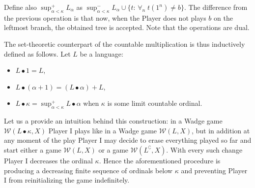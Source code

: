 Define also
$\sup^+ _{\alpha < \kappa} L_\alpha$ as $\sup^-_{\alpha < \kappa} L_\alpha\cup \{t :\, \forall_n\; t(1^n)\neq b\}$.
The difference from the previous operation is that now, when the
Player does not plays $b$ on the leftmost branch, the obtained tree is
accepted. Note that the operations are dual. 
%





The set-theoretic counterpart of the countable multiplication is thus  inductively defined as follows. 
Let $L$ be a language: 
\begin{itemize}
\item $L \bullet 1 = L$, 
\item $L \bullet (\alpha + 1) = (L \bullet \alpha)+L$, 
\item $L \bullet \kappa = \sup^+_{\alpha < \kappa} L \bullet \alpha$ when $\kappa$  is some limit countable ordinal.
\end{itemize}

Let us a provide an intuition behind this construction:  in a Wadge game $\mathcal{W}(L\bullet \kappa, X)$ Player I plays like in a Wadge game $\mathcal{W}(L, X)$, but in addition at any moment of the play Player I may decide to erase everything played so far and start either a game $\mathcal{W}(L, X)$ or a game $\mathcal{W}(L^\complement, X)$. 
With every such change Player I decreases the ordinal $\kappa$. Hence the aforementioned procedure is producing a decreasing finite sequence of ordinals below $\kappa$ and preventing Player I from reinitializing the game indefinitely.

